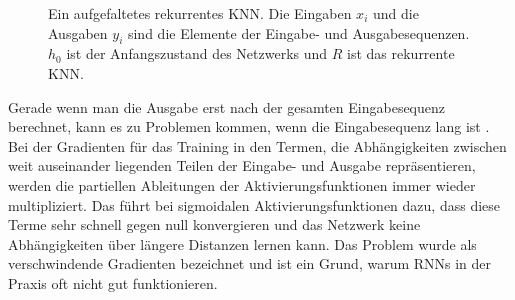 \begin{figure}
\centering
\caption{Ein \glqq aufgefaltetes\grqq{} rekurrentes KNN. Die Eingaben $x_i$ und die Ausgaben $y_i$ sind die Elemente der Eingabe- und Ausgabesequenzen. $h_0$ ist der Anfangszustand des Netzwerks und $R$ ist das rekurrente KNN.}
\label{fig:rnn}
\end{figure}

Gerade wenn man die Ausgabe erst nach der gesamten Eingabesequenz berechnet, kann es zu Problemen kommen, wenn die Eingabesequenz lang ist \cite{vanishing_gradients}.
Bei der Gradienten für das Training in den Termen, die Abhängigkeiten zwischen weit auseinander liegenden Teilen der Eingabe- und Ausgabe repräsentieren, werden die partiellen Ableitungen der Aktivierungsfunktionen immer wieder multipliziert.
Das führt bei sigmoidalen Aktivierungsfunktionen dazu, dass diese Terme sehr schnell gegen null konvergieren und das Netzwerk keine Abhängigkeiten über längere Distanzen lernen kann.
Das Problem wurde als \glqq verschwindende Gradienten\grqq{} bezeichnet und ist ein Grund, warum RNNs in der Praxis oft nicht gut funktionieren.

